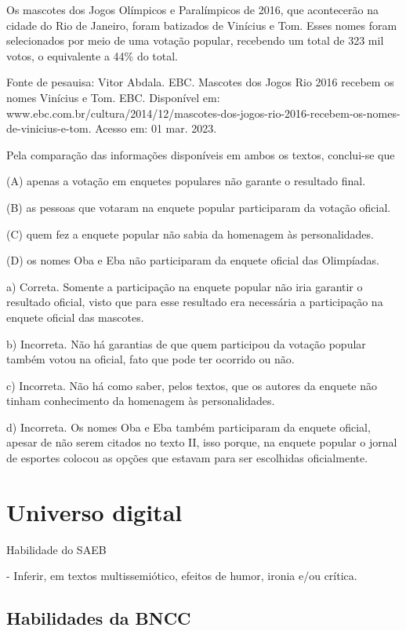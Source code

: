 \begin{itemize}
\begin{itemize}
{\begin{itemize}
\begin{itemize}
Os mascotes dos Jogos Olímpicos e Paralímpicos de 2016, que acontecerão
na cidade do Rio de Janeiro, foram batizados de Vinícius e Tom. Esses
nomes foram selecionados por meio de uma votação popular, recebendo um
total de 323 mil votos, o equivalente a 44\% do total.

Fonte de pesauisa: Vitor Abdala. EBC. Mascotes dos Jogos Rio 2016
recebem os nomes Vinícius e Tom. EBC. Disponível em:
www.ebc.com.br/cultura/2014/12/mascotes-dos-jogos-rio-2016-recebem-os-nomes-de-vinicius-e-tom.
Acesso em: 01 mar. 2023.

Pela comparação das informações disponíveis em ambos os textos,
conclui-se que

(A) apenas a votação em enquetes populares não garante o resultado
final.

(B) as pessoas que votaram na enquete popular participaram da votação
oficial.

(C) quem fez a enquete popular não sabia da homenagem às personalidades.

(D) os nomes Oba e Eba não participaram da enquete oficial das
Olimpíadas.

a) Correta. Somente a participação na enquete popular não iria garantir
o resultado oficial, visto que para esse resultado era necessária a
participação na enquete oficial das mascotes.

b) Incorreta. Não há garantias de que quem participou da votação popular
também votou na oficial, fato que pode ter ocorrido ou não.

c) Incorreta. Não há como saber, pelos textos, que os autores da enquete
não tinham conhecimento da homenagem às personalidades.

d) Incorreta. Os nomes Oba e Eba também participaram da enquete oficial,
apesar de não serem citados no texto II, isso porque, na enquete popular
o jornal de esportes colocou as opções que estavam para ser escolhidas
oficialmente.

\chapter{Universo digital}

Habilidade do SAEB

- Inferir, em textos multissemiótico, efeitos de humor, ironia e/ou
crítica.

\section{Habilidades da BNCC}


\end{itemize}
\end{itemize}}
\end{itemize}
\end{itemize}

